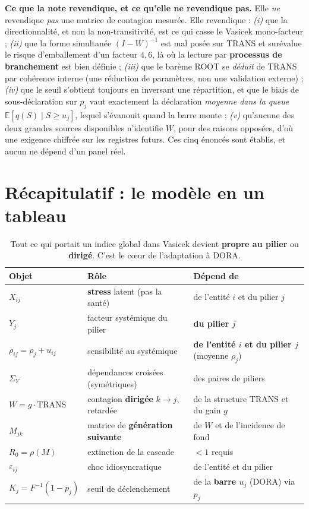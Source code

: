 \documentclass[11pt,a4paper]{article}
\newcommand{\Y}{Y}
\newcommand{\eps}{\varepsilon}
\begin{document}
\begin{cle}
\textbf{Ce que la note revendique, et ce qu'elle ne revendique pas.} Elle \emph{ne} revendique
\emph{pas} une matrice de contagion mesurée. Elle revendique : \emph{(i)} que la
directionnalité, et non la non-transitivité, est ce qui casse le Vasicek mono-facteur ;
\emph{(ii)} que la forme simultanée $(I-W)^{-1}$ est mal posée sur TRANS et surévalue le
risque d'emballement d'un facteur $4{,}6$, là où la lecture par \textbf{processus de
branchement} est bien définie ; \emph{(iii)} que le barème ROOT se \emph{déduit} de TRANS par cohérence interne (une réduction
de paramètres, non une validation externe) ; \emph{(iv)}
que le seuil s'obtient toujours en inversant une répartition, et que le biais de sous-déclaration
sur $p_j$ vaut exactement la déclaration \emph{moyenne dans la queue}
$\mathbb E[q(S)\mid S\ge u_j]$, lequel s'évanouit quand la barre monte ; \emph{(v)} qu'aucune des deux grandes sources disponibles
n'identifie $W$, pour des raisons opposées, d'où une exigence chiffrée sur les registres
futurs. Ces cinq énoncés sont établis, et aucun ne dépend d'un panel réel.
\end{cle}

\section{Récapitulatif : le modèle en un tableau}

\begin{table}[htbp]\centering\small
\renewcommand{\arraystretch}{1.35}
\begin{tabular}{@{}l l >{\raggedright\arraybackslash}p{5.8cm}@{}}
\toprule
\textbf{Objet} & \textbf{Rôle} & \textbf{Dépend de} \\
\midrule
$X_{ij}$ & \textbf{stress} latent (pas la santé) & de l'entité $i$ et du pilier $j$ \\
$\Y_j$ & facteur systémique du pilier & \textbf{du pilier $j$} \\
$\rho_{ij}=\rho_j+u_{ij}$ & sensibilité au systémique & \textbf{de l'entité $i$ et du pilier $j$} (moyenne $\rho_j$) \\
$\Sigma_Y$ & dépendances croisées (symétriques) & des paires de piliers \\
$W = g\cdot\mathrm{TRANS}$ & contagion \textbf{dirigée} $k\to j$, retardée & de la structure TRANS et du gain $g$ \\
$M_{jk}$ & matrice de \textbf{génération suivante} & de $W$ et de l'incidence de fond \\
$R_0 = \rho(M)$ & extinction de la cascade & $<1$ requis \\
$\eps_{ij}$ & choc idiosyncratique & de l'entité et du pilier \\
$K_j = F^{-1}(1-p_j)$ & seuil de déclenchement & de la \textbf{barre $u_j$} (DORA) via $p_j$ \\
\bottomrule
\end{tabular}
\caption{Tout ce qui portait un indice global dans Vasicek devient \textbf{propre au pilier}
ou \textbf{dirigé}. C'est le c\oe ur de l'adaptation à DORA.}
\end{table}
\end{document}
